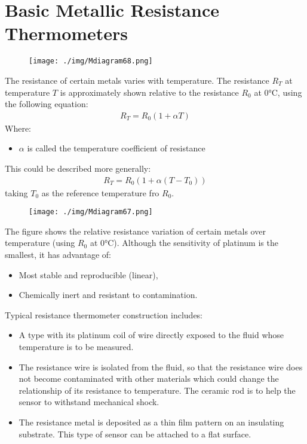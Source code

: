 \section{Basic Metallic Resistance Thermometers}
\begin{figure}[H]
  \centering
  \texttt{[image: ./img/Mdiagram68.png]}
\end{figure}
The resistance of certain metals varies with temperature. The resistance $R_T$ at temperature $T$ is approximately shown relative to the resistance $R_0$ at $\ang{0}$C, using the following equation:
\begin{gather}
  R_T = R_0 (1+\alpha T)
\end{gather}
Where:
\begin{itemize}
  \item $\alpha$ is called the temperature coefficient of resistance
\end{itemize}
This could be described more generally:
\begin{gather}
  R_T = R_0(1+\alpha(T-T_0))
\end{gather}
taking $T_0$ as the reference temperature fro $R_0$.
\begin{figure}[H]
  \centering
  \texttt{[image: ./img/Mdiagram67.png]}
\end{figure}
The figure shows the relative resistance variation of certain metals over temperature (using $R_0$ at $\ang{0}$C). Although the sensitivity of platinum is the smallest, it has advantage of:
\begin{itemize}
  \item Most stable and reproducible (linear),
  \item Chemically inert and resistant to contamination.
\end{itemize}
Typical resistance thermometer construction includes:
\begin{itemize}
  \item A type with its platinum coil of wire directly exposed to the fluid whose temperature is to be measured.
  \item The resistance wire is isolated from the fluid, so that the resistance wire does not become contaminated with other materials which could change the relationship of its resistance to temperature. The ceramic rod is to help the sensor to withstand mechanical shock.
  \item The resistance metal is deposited as a thin film pattern on an insulating substrate. This type of sensor can be attached to a flat surface.
\end{itemize}
